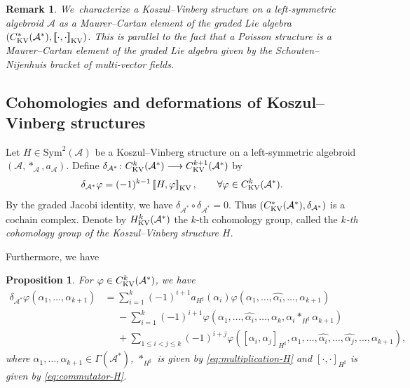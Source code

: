 \documentclass[10pt,a4paper]{amsart}
\numberwithin{equation}{section}
\newtheorem{pro}[thm]{Proposition}
\newtheorem{rmk}[thm]{Remark}
\newcommand{\huaA}{\mathcal{A}}
\newcommand{\Courant}[1]{\left[\!\left[ #1\right]\!\right]}
\newcommand{\Sym}{\mathrm{Sym}}
\begin{document}
\begin{rmk}
We~characterize a Koszul--Vinberg structure on a left-symmetric algebroid $\huaA$ as a Maurer--Cartan element of the graded Lie algebra $(C_{\rm KV}^{*}(\huaA^*),\Courant{\cdot,\cdot}_{\rm KV})$. This is parallel to the fact that a Poisson structure is a Maurer--Cartan element of the graded Lie algebra given by the Schouten--Nijenhuis bracket of multi-vector fields.
\end{rmk}

\subsection{Cohomologies and deformations of Koszul--Vinberg structures}


Let $H\in \Sym^2(\huaA)$ be a Koszul--Vinberg structure on a left-symmetric algebroid $(\huaA,\ast_\huaA,a_\huaA)$. Define $\delta_{\huaA^*}\colon C_{\rm KV}^{k}(\huaA^*)\longrightarrow
C_{\rm KV}^{k+1}(\huaA^*)$ by
\begin{gather*}
\delta_{\huaA^*}\varphi =(-1)^{k-1}\Courant{H,\varphi}_{\rm KV},\qquad
\forall \varphi\in C_{\rm KV}^{k}(\huaA^*).
\end{gather*}
By the graded Jacobi identity, we have $\delta_{\huaA^*}\circ \delta_{\huaA^*}=0$. Thus $(C_{\rm KV}^{*}(\huaA^*),\delta_{\huaA^*})$ is a cochain comp\-lex. Denote by $H_{\rm KV}^k(\huaA^*)$ the $k$-th cohomology group, called the {\it $k$-th cohomology group of the Koszul--Vinberg structure $H$}.

Furthermore, we have
\begin{pro}
For $\varphi\in C_{\rm KV}^{k}(\huaA^*)$, we have
 \begin{align*}%
\delta_{\huaA^*}\varphi(\alpha_1,\dots,\alpha_{k+1})
 &=\sum_{i=1}^{k}(-1)^{i+1}a_{H^\sharp} (\alpha_i)\varphi(\alpha_1,\dots,\hat{\alpha_i},\dots,\alpha_{k+1})
 \\
 &\phantom{=}-\sum_{i=1}^{k}(-1)^{i+1}\varphi (\alpha_1,\dots,\hat{\alpha_i},\dots,\alpha_k,\alpha_i\ast_{H^\sharp} \alpha_{k+1})
 \\
 &\phantom{=}+\sum_{1\leq i<j\leq k}(-1)^{i+j}\varphi([\alpha_i,\alpha_j]_{H^\sharp},\alpha_1, \dots,\hat{\alpha_i},\dots,\hat{\alpha_j},\dots,\alpha_{k+1}),
\end{align*}
where $\alpha_1,\dots,\alpha_{k+1}\in\Gamma(\huaA^*)$, $\ast_{H^\sharp}$ is given by \eqref{eq:multiplication-H} and $[\cdot,\cdot]_{H^\sharp}$ is given by \eqref{eq:commutator-H}.
\end{pro}
\end{document}
